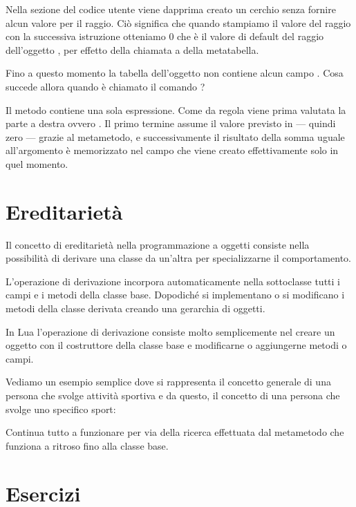 Nella sezione del codice utente viene dapprima creato un cerchio senza fornire
alcun valore per il raggio. Ciò significa che quando stampiamo il valore del
raggio con la successiva istruzione otteniamo \( 0 \) che è il valore di default
del raggio dell'oggetto , per effetto della chiamata a
 della metatabella.

Fino a questo momento la tabella dell'oggetto  non contiene alcun campo
. Cosa succede allora quando è chiamato il comando
?

Il metodo  contiene una sola espressione. Come da regola viene
prima valutata la parte a destra ovvero . Il primo termine
assume il valore previsto in  --- quindi zero --- grazie al
metametodo, e successivamente il risultato della somma uguale all'argomento
 è memorizzato nel campo  che viene creato effettivamente
solo in quel momento.


\section{Ereditarietà}

Il concetto di ereditarietà nella programmazione a oggetti consiste nella
possibilità di derivare una classe da un'altra per specializzarne il
comportamento.

L'operazione di derivazione incorpora automaticamente nella sottoclasse tutti i
campi e i metodi della classe base. Dopodiché si implementano o si modificano i
metodi della classe derivata creando una gerarchia di oggetti.

In Lua l'operazione di derivazione consiste molto semplicemente nel creare un
oggetto con il costruttore della classe base e modificarne o aggiungerne metodi
o campi.

Vediamo un esempio semplice dove si rappresenta il concetto generale di una
persona che svolge attività sportiva e da questo, il concetto di una persona
che svolge uno specifico sport:

Continua tutto a funzionare per via della ricerca effettuata dal metametodo
 che funziona a ritroso fino alla classe base.


\section{Esercizi}

